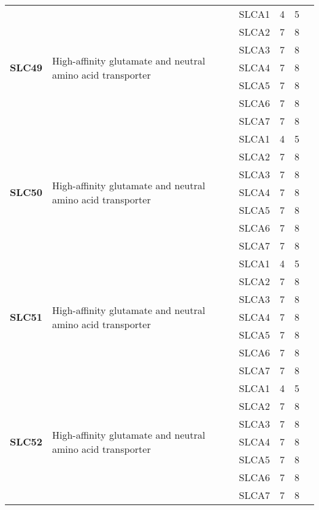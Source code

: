 \documentclass[12pt]{report}
\begin{document}
\begin{center}
\begin{longtable}{|p{1.5cm}|p{3.2cm}|p{1.9cm}|p{1.65cm}|p{3cm}|p{3cm}|}
\hline
\multirow{7}{1.5cm}{\textbf{SLC49}} & \multirow{7}{4cm}{High-affinity glutamate and neutral amino acid transporter} & SLCA1 & 4 & 5\\ 
\cline{3-6}
&&SLCA2&7 & 8&\\ 
\cline{3-6}
&&SLCA3&7 & 8&\\ 
\cline{3-6}
&&SLCA4&7 & 8&\\ 
\cline{3-6}
&&SLCA5&7 & 8&\\ 
\cline{3-6}
&&SLCA6&7 & 8&\\ 
\cline{3-6}
&&SLCA7&7 & 8&\\ 
\hline
\multirow{7}{1.5cm}{\textbf{SLC50}} & \multirow{7}{4cm}{High-affinity glutamate and neutral amino acid transporter} & SLCA1 & 4 & 5\\ 
\cline{3-6}
&&SLCA2&7 & 8&\\ 
\cline{3-6}
&&SLCA3&7 & 8&\\ 
\cline{3-6}
&&SLCA4&7 & 8&\\ 
\cline{3-6}
&&SLCA5&7 & 8&\\ 
\cline{3-6}
&&SLCA6&7 & 8&\\ 
\cline{3-6}
&&SLCA7&7 & 8&\\ 
\hline
\multirow{7}{1.5cm}{\textbf{SLC51}} & \multirow{7}{4cm}{High-affinity glutamate and neutral amino acid transporter} & SLCA1 & 4 & 5\\ 
\cline{3-6}
&&SLCA2&7 & 8&\\ 
\cline{3-6}
&&SLCA3&7 & 8&\\ 
\cline{3-6}
&&SLCA4&7 & 8&\\ 
\cline{3-6}
&&SLCA5&7 & 8&\\ 
\cline{3-6}
&&SLCA6&7 & 8&\\ 
\cline{3-6}
&&SLCA7&7 & 8&\\ 
\hline
\multirow{7}{1.5cm}{\textbf{SLC52}} & \multirow{7}{4cm}{High-affinity glutamate and neutral amino acid transporter} & SLCA1 & 4 & 5\\ 
\cline{3-6}
&&SLCA2&7 & 8&\\ 
\cline{3-6}
&&SLCA3&7 & 8&\\ 
\cline{3-6}
&&SLCA4&7 & 8&\\ 
\cline{3-6}
&&SLCA5&7 & 8&\\ 
\cline{3-6}
&&SLCA6&7 & 8&\\ 
\cline{3-6}
&&SLCA7&7 & 8&\\ 
\hline

\end{longtable}
\end{center}
\end{document}
